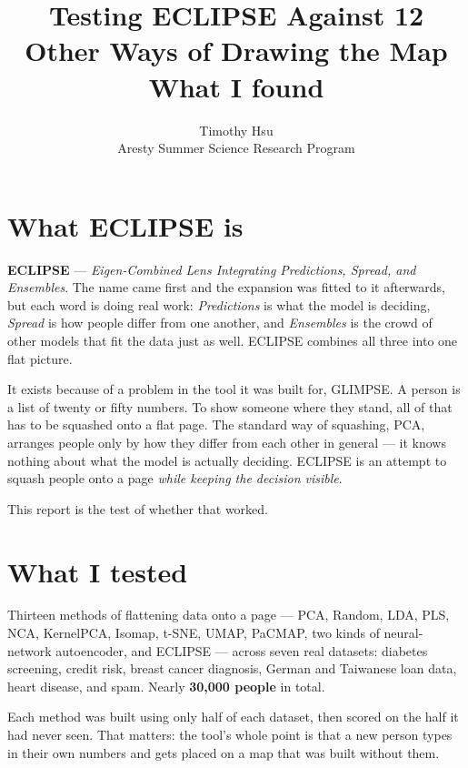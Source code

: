 \documentclass[11pt]{article}
\title{\bfseries Testing ECLIPSE Against 12 Other Ways of Drawing the Map\\[5pt]
\large What I found}
\author{Timothy Hsu \\ \small Aresty Summer Science Research Program}
\date{}
\newcommand{\hl}[1]{\textcolor{accent}{\textbf{#1}}}
\begin{document}
\maketitle

\section*{What ECLIPSE is}

\textbf{ECLIPSE} --- \emph{Eigen-Combined Lens Integrating Predictions, Spread, and
Ensembles}. The name came first and the expansion was fitted to it afterwards, but each
word is doing real work: \emph{Predictions} is what the model is deciding, \emph{Spread}
is how people differ from one another, and \emph{Ensembles} is the crowd of other models
that fit the data just as well. ECLIPSE combines all three into one flat picture.

It exists because of a problem in the tool it was built for, GLIMPSE. A person is a list
of twenty or fifty numbers. To show someone where they stand, all of that has to be
squashed onto a flat page. The standard way of squashing, PCA, arranges people only by
how they differ from each other in general --- it knows nothing about what the model is
actually deciding. ECLIPSE is an attempt to squash people onto a page \emph{while keeping
the decision visible}.

This report is the test of whether that worked.

\section*{What I tested}

Thirteen methods of flattening data onto a page --- PCA, Random, LDA, PLS, NCA,
KernelPCA, Isomap, t-SNE, UMAP, PaCMAP, two kinds of neural-network autoencoder, and
ECLIPSE --- across seven real datasets: diabetes screening, credit risk, breast cancer
diagnosis, German and Taiwanese loan data, heart disease, and spam. Nearly
\hl{30,000 people} in total.

Each method was built using only half of each dataset, then scored on the half it had
never seen. That matters: the tool's whole point is that a new person types in their own
numbers and gets placed on a map that was built without them.
\end{document}
